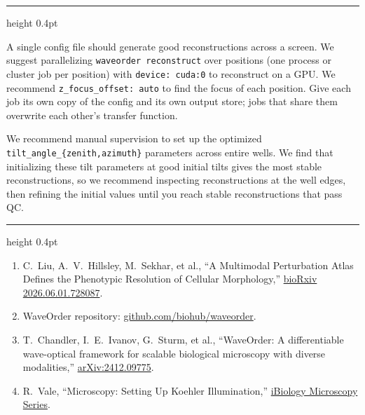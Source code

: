 \documentclass[9pt]{extarticle}
\newcommand{\mysectiontop}[1]{{\Large\bfseries #1}\par\vspace{2pt}}
\newcommand{\sectionrule}{\par\vspace{\dimexpr2pt+\parskip\relax plus 1fill}%
{\color{boxframe}\hrule height 0.4pt}\vspace{2pt plus 1fill}}
\newcommand{\mysection}[1]{\sectionrule\mysectiontop{#1}}
\begin{document}
\mysection{Scaling up}

A single config file should generate good reconstructions across a screen. We suggest parallelizing
\texttt{waveorder reconstruct} over positions (one process or cluster job
per position) with \texttt{device:~cuda:0} to reconstruct on a GPU. We recommend
\texttt{z\_focus\_offset:~auto} to find the focus of each position. Give each job its own copy of the config and
its own output store; jobs that share them overwrite each other's transfer function.

We recommend manual supervision
to set up the optimized \texttt{tilt\_angle\_\{zenith,azimuth\}} parameters across entire wells. We find that initializing these tilt parameters at good initial tilts gives the most stable reconstructions, so we recommend inspecting
reconstructions at the well edges, then refining the initial values until you reach stable reconstructions that pass QC.

\mysection{References}

\sloppy\footnotesize
\begin{enumerate}[leftmargin=*,labelindent=0pt,align=left]
\item C.~Liu, A.~V.~Hillsley, M.~Sekhar, et al., ``A Multimodal Perturbation
  Atlas Defines the Phenotypic Resolution of Cellular Morphology,''
  \href{https://www.biorxiv.org/content/10.64898/2026.06.01.728087v1}{bioRxiv
  2026.06.01.728087}.
\item WaveOrder repository:
  \href{https://github.com/biohub/waveorder}{github.com/biohub/waveorder}.
\item T.~Chandler, I.~E.~Ivanov, G.~Sturm, et al.,
  ``WaveOrder: A differentiable wave-optical framework for scalable
  biological microscopy with diverse modalities,''
  \href{https://arxiv.org/abs/2412.09775}{arXiv:2412.09775}.
\item R.~Vale, ``Microscopy: Setting Up Koehler Illumination,''
  \href{https://www.ibiology.org/talks/set-up-koehler-illumination/}{iBiology
  Microscopy Series}.
\end{enumerate}
\end{document}
